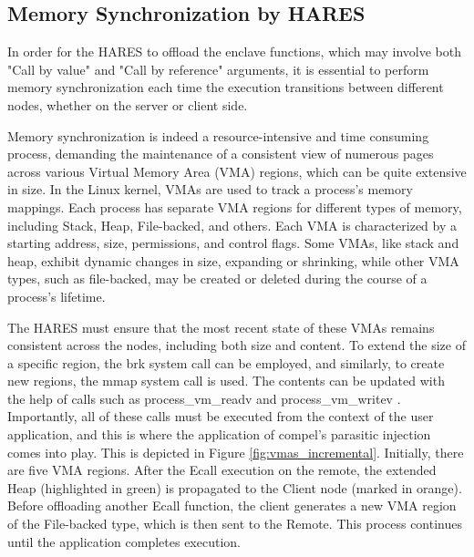 \documentclass[article, doublespace,nopageskip]{VTthesis} %
\newcommand{\monitor}{HARES }
\begin{document}
    \subsection{Memory Synchronization by \monitor}
    In order for the \monitor to offload the enclave functions, which may involve both "Call by value" and "Call by reference" arguments, it is essential to perform memory synchronization each time the execution transitions between different nodes, whether on the server or client side. 
    
    Memory synchronization is indeed a resource-intensive and time consuming process, demanding the maintenance of a consistent view of numerous pages across various Virtual Memory Area (VMA) regions, which can be quite extensive in size. In the Linux kernel, VMAs are used to track a process's memory mappings. Each process has separate VMA regions for different types of memory, including Stack, Heap, File-backed, and others. Each VMA is characterized by a starting address, size, permissions, and control flags. Some VMAs, like stack and heap, exhibit dynamic changes in size, expanding or shrinking, while other VMA types, such as file-backed, may be created or deleted during the course of a process's lifetime.

    The \monitor must ensure that the most recent state of these VMAs remains consistent across the nodes, including both size and content. To extend the size of a specific region, the brk system call \cite{systemcall::brk} can be employed, and similarly, to create new regions, the mmap system call \cite{systemcall::mmap} is used. The contents can be updated with the help of calls such as process\_vm\_readv \cite{processVmReadv} and process\_vm\_writev \cite{processVmWritev}. Importantly, all of these calls must be executed from the context of the user application, and this is where the application of compel's parasitic injection comes into play. This is depicted in Figure \ref{fig:vmas_incremental}. Initially, there are five VMA regions. After the Ecall execution on the remote, the extended Heap (highlighted in green) is propagated to the Client node (marked in orange). Before offloading another Ecall function, the client generates a new VMA region of the File-backed type, which is then sent to the Remote. This process continues until the application completes execution.
\end{document}
